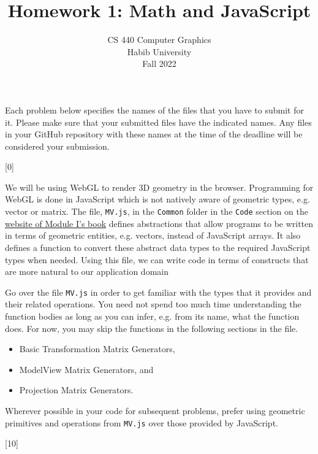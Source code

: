\documentclass[addpoints]{exam}
\title{Homework 1: Math and JavaScript}
\author{CS 440 Computer Graphics\\Habib University\\Fall 2022}
\date{}
\begin{document}
\maketitle

Each problem below specifies the names of the files that you have to submit for it. Please make sure that your submitted files have the indicated names. Any files in your GitHub repository with these names at the time of the deadline will be considered your submission.

\begin{questions}

  [0]

  We will be using WebGL to render 3D geometry in the browser. Programming for WebGL is done in JavaScript which is not natively aware of geometric types, e.g. vector or matrix. The file, \texttt{MV.js}, in the \texttt{Common} folder in the \texttt{Code} section on the \href{https://www.cs.unm.edu/~angel/BOOK/INTERACTIVE_COMPUTER_GRAPHICS/SEVENTH_EDITION/}{website of Module I's book} defines abstractions that allow programs to be written in terms of geometric entities, e.g. vectors, instead of JavaScript arrays. It also defines a function to convert these abstract data types to the required JavaScript types when needed. Using this file, we can write code in terms of constructs that are more natural to our application domain

  Go over the file {\tt MV.js} in order to get familiar with the types that it provides and their related operations. You need not spend too much time understanding the function bodies as long as you can infer, e.g. from its name, what the function does. For now, you may skip the functions in the following sections in the file.
  \begin{itemize}
  \item Basic Transformation Matrix Generators, 
  \item ModelView Matrix Generators, and
  \item Projection Matrix Generators.
  \end{itemize}

  Wherever possible in your code for subsequent problems, prefer using geometric primitives and operations from {\tt MV.js} over those provided by JavaScript.
  
  [10]


\end{questions}
\end{document}
